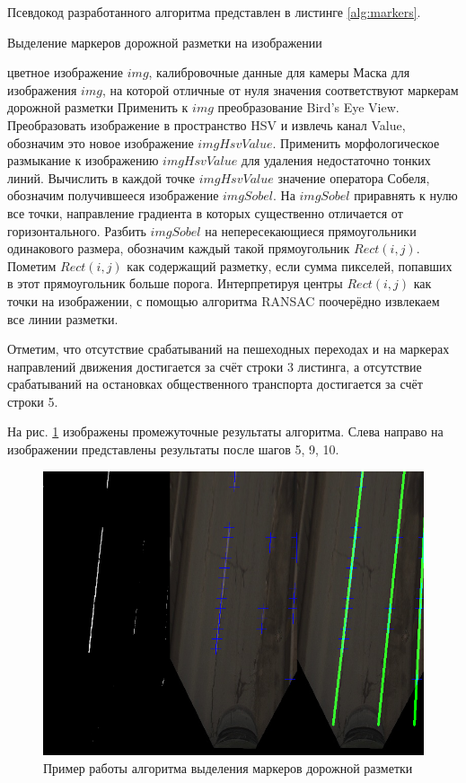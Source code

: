\documentclass[aps,%
14pt,%
final,%
oneside,
onecolumn,%
musixtex, %
superscriptaddress,%
centertags]{extarticle} %
\begin{document}
Псевдокод разработанного алгоритма представлен в листинге \ref{alg:markers}.

\begin{algorithm}
\caption{Выделение маркеров дорожной разметки на изображении}\label{alg:euclid}
\label{alg:markers}
\begin{algorithmic}[1]
\Require цветное изображение $img$, калибровочные данные для камеры
\Ensure Маска для изображения $img$, на которой отличные от нуля значения соответствуют маркерам дорожной разметки
\State Применить к $img$ преобразование Bird's Eye View.
\State Преобразовать изображение в пространство HSV и извлечь канал Value, обозначим это новое изображение $imgHsvValue$.
\State Применить морфологическое размыкание к изображению $imgHsvValue$ для удаления недостаточно тонких линий.
\State Вычислить в каждой точке $imgHsvValue$ значение оператора Собеля, обозначим получившееся изображение $imgSobel$.
\State На $imgSobel$ приравнять к нулю все точки, направление градиента в которых существенно отличается от горизонтального.
\State Разбить $imgSobel$ на непересекающиеся прямоугольники одинакового размера, обозначим каждый такой прямоугольник $Rect(i, j)$.
\State Пометим $Rect(i, j)$ как содержащий разметку, если сумма пикселей, попавших в этот прямоугольник больше порога.
\EndFor
\State Интерпретируя центры $Rect(i, j)$ как точки на изображении, с помощью алгоритма RANSAC поочерёдно извлекаем все линии разметки.
\end{algorithmic}
\end{algorithm}

Отметим, что отсутствие срабатываний на пешеходных переходах и на маркерах направлений движения достигается за счёт строки 3 листинга, а отсутствие срабатываний на остановках общественного транспорта достигается за счёт строки 5.

На рис. \ref{fig:lanes_pipline} изображены промежуточные результаты алгоритма. Слева направо на изображении представлены результаты после шагов 5, 9, 10. 

\begin{figure}[H]
     \includegraphics[width=\textwidth]{lanes_pipeline.png}
     \caption{Пример работы алгоритма выделения маркеров дорожной разметки}
     \label{fig:lanes_pipline}
\end{figure}
\end{document}
